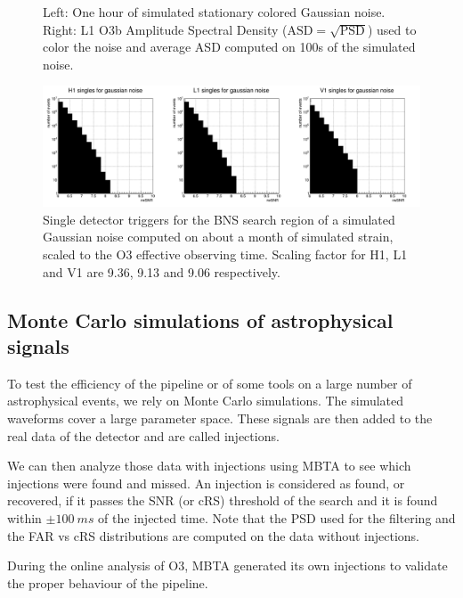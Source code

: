 \begin{figure}[hb]
\begin{minipage}{0.45\linewidth}
  \end{minipage}
  \caption{Left: One hour of simulated stationary colored Gaussian noise. Right: L1 O3b Amplitude Spectral Density ($\text{ASD}=\sqrt{\text{PSD}}$) used to color the noise and average ASD computed on 100s of the simulated noise.}
  \label{fig:colored_gaus}
\end{figure}

%
\begin{figure}[hb]
  \centering
  \includegraphics[width=\textwidth]{sectionSelection/plotsOther/cGausSingles.png}
  \caption{Single detector triggers for the BNS search region of a simulated Gaussian noise computed on about a month of simulated strain, scaled to the O3 effective observing time. Scaling factor for H1, L1 and V1 are 9.36, 9.13 and 9.06 respectively.}
  \label{fig:gaussian_noise}
\end{figure}




\clearpage\newpage
\subsection{Monte Carlo simulations of astrophysical signals}
\label{sec:inj}

To test the efficiency of the pipeline or of some tools on a large number of astrophysical events, we rely on Monte Carlo simulations.
The simulated waveforms cover a large parameter space.
These signals are then added to the real data of the detector and are called injections.

We can then analyze those data with injections using MBTA to see which injections were found and missed.
An injection is considered as found, or recovered, if it passes the SNR (or cRS) threshold of the search and it is found within $\pm \SI{100}{ms}$ of the injected time.
Note that the PSD used for the filtering and the FAR vs cRS distributions are computed on the data without injections.

During the online analysis of O3, MBTA generated its own injections to validate the proper behaviour of the pipeline.


